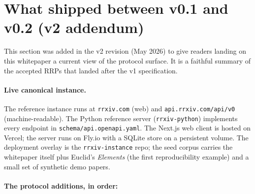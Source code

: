 \documentclass[11pt]{rrxiv}
\begin{document}
\section{What shipped between v0.1 and v0.2 (v2 addendum)}
\label{sec:shipped-v0.2}

This section was added in the v2 revision (May 2026) to give readers landing on this whitepaper a current view of the protocol surface. It is a faithful summary of the accepted RRPs that landed after the v1 specification.

\paragraph{Live canonical instance.} The reference instance runs at \texttt{rrxiv.com} (web) and \texttt{api.rrxiv.com/api/v0} (machine-readable). The Python reference server (\texttt{rrxiv-python}) implements every endpoint in \texttt{schema/api.openapi.yaml}. The Next.js web client is hosted on Vercel; the server runs on Fly.io with a SQLite store on a persistent volume. The deployment overlay is the \texttt{rrxiv-instance} repo; the seed corpus carries the whitepaper itself plus Euclid's \emph{Elements} (the first reproducibility example) and a small set of synthetic demo papers.

\paragraph{The protocol additions, in order:}
\end{document}
